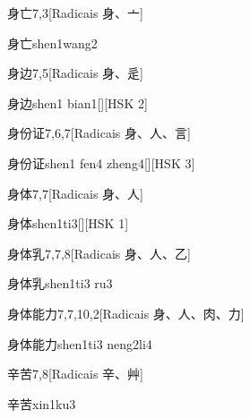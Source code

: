 \begin{entry}{身亡}{7,3}[Radicais ⾝、⼇]
  \begin{phonetics}{身亡}{shen1wang2}
  \end{phonetics}
\end{entry}

\begin{entry}{身边}{7,5}[Radicais ⾝、⾡]
  \begin{phonetics}{身边}{shen1 bian1}[][HSK 2]
  \end{phonetics}
\end{entry}

\begin{entry}{身份证}{7,6,7}[Radicais ⾝、⼈、⾔]
  \begin{phonetics}{身份证}{shen1 fen4 zheng4}[][HSK 3]
  \end{phonetics}
\end{entry}

\begin{entry}{身体}{7,7}[Radicais ⾝、⼈]
  \begin{phonetics}{身体}{shen1ti3}[][HSK 1]
  \end{phonetics}
\end{entry}

\begin{entry}{身体乳}{7,7,8}[Radicais ⾝、⼈、⼄]
  \begin{phonetics}{身体乳}{shen1ti3 ru3}
  \end{phonetics}
\end{entry}

\begin{entry}{身体能力}{7,7,10,2}[Radicais ⾝、⼈、⾁、⼒]
  \begin{phonetics}{身体能力}{shen1ti3 neng2li4}
  \end{phonetics}
\end{entry}

\begin{entry}{辛苦}{7,8}[Radicais ⾟、⾋]
  \begin{phonetics}{辛苦}{xin1ku3}
  \end{phonetics}
\end{entry}

